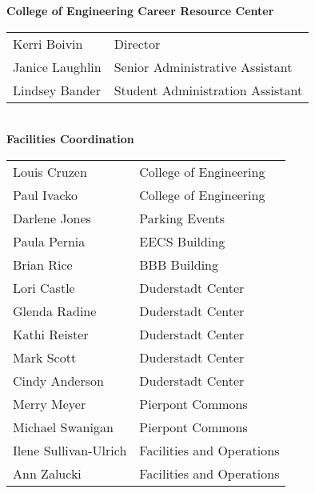 \documentclass[twoside]{article}
\begin{document}
    { \fontsize{14}{17}\selectfont \bf College of Engineering Career Resource Center}\\\begin{tabular}{p{2in}l}
    Kerri Boivin	&	Director\\
        Janice Laughlin	&	Senior Administrative Assistant\\
        Lindsey Bander	&	Student Administration Assistant\\
        \end{tabular}\\[1em]
    
    { \fontsize{14}{17}\selectfont \bf Facilities Coordination}\\\begin{tabular}{p{2in}l}
    Louis Cruzen	&	College of Engineering\\
        Paul Ivacko	&	College of Engineering\\
        Darlene Jones	&	Parking Events\\
        Paula Pernia	&	EECS Building\\
        Brian Rice	&	BBB Building\\
        Lori Castle	&	Duderstadt Center\\
        Glenda Radine	&	Duderstadt Center\\
        Kathi Reister	&	Duderstadt Center\\
        Mark Scott	&	Duderstadt Center\\
        Cindy Anderson	&	Duderstadt Center\\
        Merry Meyer	&	Pierpont Commons\\
        Michael Swanigan	&	Pierpont Commons\\
        Ilene Sullivan-Ulrich	&	Facilities and Operations\\
        Ann Zalucki	&	Facilities and Operations\\
        \end{tabular}\\[1em]
    
\end{document}
